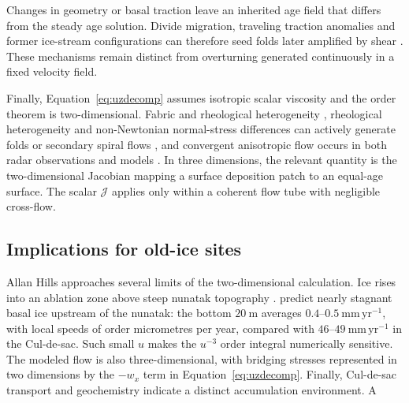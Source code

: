 \documentclass[review]{igs}
\providecommand{\DIFadd}[1]{{\protect\color{blue} \sf #1}} %
\providecommand{\DIFdel}[1]{{\protect\color{red} \scriptsize #1}} %
\providecommand{\DIFaddbegin}{} %
\providecommand{\DIFaddend}{} %
\providecommand{\DIFdelbegin}{} %
\providecommand{\DIFdelend}{} %
\newcommand{\DIFscaledelfig}{0.5}
\newlength{\DIFdelgraphicswidth} %
\newlength{\DIFdelgraphicsheight} %
\newcommand{\DIFaddincludegraphics}[2][]{{\color{blue}\fbox{\DIFOincludegraphics[#1]{#2}}}} %
\newcommand{\DIFdelincludegraphics}[2][]{%
\sbox{\DIFdelgraphicsbox}{\DIFOincludegraphics[#1]{#2}}%
\settoboxwidth{\DIFdelgraphicswidth}{\DIFdelgraphicsbox} %
\settoboxtotalheight{\DIFdelgraphicsheight}{\DIFdelgraphicsbox} %
\scalebox{\DIFscaledelfig}{%
\parbox[b]{\DIFdelgraphicswidth}{\usebox{\DIFdelgraphicsbox}\\[-\baselineskip] \rule{\DIFdelgraphicswidth}{0em}}\llap{\resizebox{\DIFdelgraphicswidth}{\DIFdelgraphicsheight}{%
\setlength{\unitlength}{\DIFdelgraphicswidth}%
\begin{picture}(1,1)%
\thicklines\linethickness{2pt} %
{\color[rgb]{1,0,0}\put(0,0){\framebox(1,1){}}}%
{\color[rgb]{1,0,0}\put(0,0){\line( 1,1){1}}}%
{\color[rgb]{1,0,0}\put(0,1){\line(1,-1){1}}}%
\end{picture}%
}\hspace*{3pt}}} %
} %
\DeclareRobustCommand{\DIFaddbegin}{\DIFOaddbegin \let\includegraphics\DIFaddincludegraphics} %
\DeclareRobustCommand{\DIFaddend}{\DIFOaddend \let\includegraphics\DIFOincludegraphics} %
\DeclareRobustCommand{\DIFdelbegin}{\DIFOdelbegin \let\includegraphics\DIFdelincludegraphics} %
\DeclareRobustCommand{\DIFdelend}{\DIFOaddend \let\includegraphics\DIFOincludegraphics} %
\begin{document}
Changes in geometry or basal traction leave an inherited age field that differs from the steady age solution. Divide migration, traveling traction anomalies and former ice-stream configurations can therefore seed folds later amplified by shear \citep{JacobelBindschadler1993,JacobsonWaddington2005,Wolovick2014,WolovickCreyts2016,Franke2022,Jansen2024}. These mechanisms remain distinct from overturning generated continuously in a fixed velocity field.

Finally, Equation~\ref{eq:uzdecomp} assumes isotropic scalar viscosity and the order theorem is two-dimensional. Fabric\DIFdelbegin \DIFdel{and rheological heterogeneity }\DIFdelend \DIFaddbegin \DIFadd{, rheological heterogeneity and non-Newtonian normal-stress differences }\DIFaddend can actively generate folds \DIFdelbegin \DIFdel{\citep{Alley1997,ThorsteinssonWaddington2002,Bons2016,Bons2025}}\DIFdelend \DIFaddbegin \DIFadd{or secondary spiral flows \citep{Alley1997,ThorsteinssonWaddington2002,SchoofClarke2008,Bons2016,Bons2025}}\DIFaddend , and convergent anisotropic flow occurs in both radar observations and models \citep{Ross2020,MartinGudmundssonPritchardGagliardini2009}. In three dimensions, the relevant quantity is the two-dimensional Jacobian mapping a surface deposition patch to an equal-age surface. The scalar \(\mathcal{J}\) applies only within a coherent flow tube with negligible cross-flow.

\subsection{Implications for old-ice sites}

Allan Hills approaches several limits of the two-dimensional calculation. Ice rises into an ablation zone above steep nunatak topography \citep{Spaulding2012,Kehrl2018,Stoll2026}. \citet{Manos2026} predict nearly stagnant basal ice upstream of the nunatak: the bottom \(20~\mathrm{m}\) averages \(0.4\)--\(0.5~\mathrm{mm\,yr^{-1}}\), with local speeds of order micrometres per year, compared with \(46\)--\(49~\mathrm{mm\,yr^{-1}}\) in the Cul-de-sac. Such small \(u\) makes the \(u^{-3}\) order integral numerically sensitive. The modeled flow is also three-dimensional, with bridging stresses represented in two dimensions by the \(-w_x\) term in Equation~\ref{eq:uzdecomp}. Finally, Cul-de-sac transport and geochemistry indicate a distinct accumulation environment.
\DIFdelbegin \DIFdel{A }\DIFdelend \DIFaddbegin 
\end{document}
